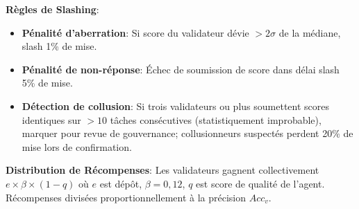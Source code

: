 \documentclass[11pt]{article}
\begin{document}
\textbf{Règles de Slashing}:
\begin{itemize}[noitemsep]
  \item \textbf{Pénalité d'aberration}: Si score du validateur dévie $>2\sigma$ de la médiane, slash 1\% de mise.
  \item \textbf{Pénalité de non-réponse}: Échec de soumission de score dans délai slash 5\% de mise.
  \item \textbf{Détection de collusion}: Si trois validateurs ou plus soumettent scores identiques sur $>10$ tâches consécutives (statistiquement improbable), marquer pour revue de gouvernance; collusionneurs suspectés perdent 20\% de mise lors de confirmation.
\end{itemize}
\textbf{Distribution de Récompenses}: Les validateurs gagnent collectivement $e \times \beta \times (1-q)$ où $e$ est dépôt, $\beta=0,12$, $q$ est score de qualité de l'agent. Récompenses divisées proportionnellement à la précision $Acc_v$.
\end{document}
